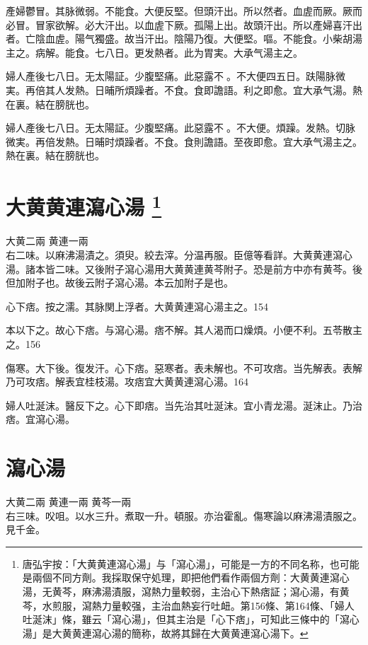 產婦鬱冒。其脉微弱。不能食。大便反堅。但頭汗出。所以然者。血虗而厥。厥而必冒。冒家欲解。必大汗出。以血虗下厥。孤陽上出。故頭汗出。所以產婦喜汗出者。亡陰血虗。陽气獨盛。故当汗出。陰陽乃復。大便堅。嘔。不能食。小柴胡湯主之。病解。能食。七八日。更发熱者。此为胃実。大承气湯主之。{\dengben}

婦人產後七八日。无太陽証。少腹堅痛。此惡露不{\sungtpii 𥁞}。不大便四五日。趺陽脉微実。再倍其人发熱。日晡所煩躁者。不食。食即譫語。利之即愈。宜大承气湯。熱在裏。結在膀胱也。{\wuben}

{\khaaitp 婦人}產後七八日。无太陽証。少腹堅痛。此惡露不{\sungtpii 𥁞}。不大便。煩躁。发熱。切脉微実。再倍发熱。日晡时煩躁者。不食。食則譫語。至夜即愈。宜大承气湯主之。熱在裏。結在膀胱也。{\dengben}

\section{大黄黄連瀉心湯
	\footnote{
		唐弘宇按：「大黄黄連瀉心湯」与「瀉心湯」，可能是一方的不同名称，也可能是兩個不同方劑。我採取保守処理，即把他們看作兩個方劑：大黄黄連瀉心湯，无黄芩，麻沸湯漬服，瀉熱力量較弱，主治心下熱痞証；瀉心湯，有黄芩，水煎服，瀉熱力量較强，主治血熱妄行吐衄。第156條、第164條、「婦人吐涎沫」條，雖云「瀉心湯」，但其主治是「心下痞」，可知此三條中的「瀉心湯」是大黄黄連瀉心湯的簡称，故將其歸在大黄黄連瀉心湯下。
	}
}

大黄{\scriptsize 二兩} 黄連{\scriptsize 一兩}\\
右二味。以麻沸湯漬之。須臾。絞去滓。分温再服。{\scriptsize 臣億等看詳。大黄黄連瀉心湯。諸本皆二味。又後附子瀉心湯用大黄黄連黄芩附子。恐是前方中亦有黄芩。後但加附子也。故後云附子瀉心湯。本云加附子是也。}

心下痞。按之濡。其脉関上浮者。大黄{\khaaitp 黄連}瀉心湯主之。154

本以下之。故心下痞。与瀉心湯。痞不解。其人渴而口燥{\khaaitp 煩}。小便不利。五苓散主之。156

傷寒。大下後。復发汗。心下痞。惡寒者。表未解也。不可攻痞。当先解表。表解乃可攻痞。解表宜桂枝湯。攻痞宜大黄黄連瀉心湯。164

婦人吐涎沫。醫反下之。心下即痞。当先治其吐涎沫。宜小青龙湯。涎沫止。乃治痞。宜瀉心湯。

\section{瀉心湯}

大黄{\scriptsize 二兩} 黄連{\scriptsize 一兩} 黄芩{\scriptsize 一兩}\\
右三味。㕮咀。以水三升。煮取一升。頓服。亦治霍亂。{\scriptsize 傷寒論以麻沸湯漬服之。見千金。}

